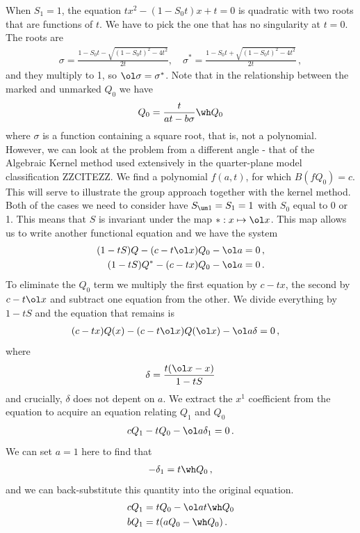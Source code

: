 When $S_1 = 1$, the equation $tx^2 -(1-S_0t)x + t = 0$ is quadratic with two roots that are functions of $t$. We have to pick the one that has no singularity at $t = 0$. The roots are
\begin{align}
\sigma = \frac{1-S_0t - \sqrt{(1-S_0t)^2-4t^2}}{2t}, \quad \sigma^\ast = \frac{1-S_0t + \sqrt{(1-S_0t)^2-4t^2}}{2t}\,,
\end{align}
and they multiply to 1, so $\ol \sigma = \sigma^\ast$. Note that in the relationship between the marked and unmarked $Q_0$ we have
\begin{align}
	Q_0 = \frac{t}{at-b\sigma}\wh Q_0
\end{align}
where $\sigma$ is a function containing a square root, that is, not a polynomial. However, we can look at the problem from a different angle - that of the Algebraic Kernel method used extensively in the quarter-plane model classification ZZCITEZZ. We find a polynomial $f(a,t)$, for which $B(fQ_0) = c$. This will serve to illustrate the group approach together with the kernel method. Both of the cases we need to consider have $S_{\um 1} = S_1 = 1$ with $S_0$ equal to 0 or 1. This means that $S$ is invariant under the map $\ast: x \mapsto \ol x$. This map allows us to write another functional equation and we have the system
\begin{align}
	(1-tS)Q - (c -t\ol x)Q_0 - \ol a=0\,,\\
	(1-tS)Q^\ast - (c -tx)Q_0 -\ol a=0\,.
\end{align}
To eliminate the $Q_0$ term we multiply the first equation by $c -tx$, the second by $c -t\ol x$ and subtract one equation from the other. We divide everything by $1-tS$ and the equation that remains is
\begin{align}
	(c-tx)Q(x) - (c-t\ol x)Q(\ol x) -\ol a\delta &= 0\,,
\end{align}
where
\begin{align}
	\delta =\frac{t(\ol x -x)}{1-tS}
\end{align}
and crucially, $\delta$ does not depent on $a$. We extract the $x^1$ coefficient from the equation to acquire an equation relating $Q_1$ and $Q_0$
\begin{align}
	c Q_1 - t Q_0 - \ol a\delta_1 = 0\,.
\end{align}
We can set $a = 1$ here to find that
\begin{align}
	-\delta_1 = t \wh Q_0\,,
\end{align}
and we can back-substitute this quantity into the original equation.
\begin{align}
\begin{split}
	c Q_1 &= t Q_0 - \ol a t \wh Q_0\\
	b Q_1 &= t (aQ_0 - \wh Q_0)\,.
\end{split}
\end{align}
